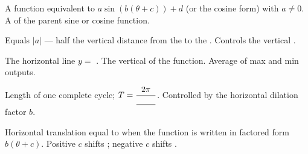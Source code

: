 \documentclass[10pt]{article}
\begin{document}
\begin{vocabbox}
\begin{description}[leftmargin=0pt, itemsep=6pt]
  \item[\termblanklong{sinusoidal function}]
    A function equivalent to $a\sin(b(\theta+c))+d$ (or the cosine form) with $a \neq 0$.
    A \underline{\hspace{3cm}} of the parent sine or cosine function.

  \item[\termblanklong{amplitude}]
    Equals $|a|$ --- half the vertical distance from the
    \underline{\hspace{2cm}} to the \underline{\hspace{2cm}}.
    Controls the vertical \underline{\hspace{2.5cm}}.

  \item[\termblanklong{midline}]
    The horizontal line $y = $ \underline{\hspace{1cm}}. The vertical
    \underline{\hspace{2cm}} of the function. Average of max and min outputs.

  \item[\termblanklong{period}]
    Length of one complete cycle; $T = \dfrac{2\pi}{\underline{\hspace{0.8cm}}}$.
    Controlled by the horizontal dilation factor $b$.

  \item[\termblanklong{phase shift}]
    Horizontal translation equal to \underline{\hspace{1.5cm}} when the function
    is written in factored form $b(\theta + c)$.
    Positive $c$ shifts \underline{\hspace{1.2cm}}; negative $c$ shifts
    \underline{\hspace{1.2cm}}.
\end{description}
\end{vocabbox}

\vspace{0.08in}
\end{document}

